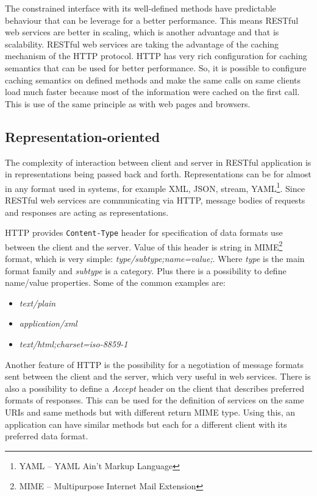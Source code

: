 \documentclass[12pt,final,oneside]{fithesis2}
\begin{document}
The constrained interface with its well-defined methods have predictable behaviour that can be leverage for a better performance. This means RESTful web services are better in scaling, which is another advantage and that is scalability. RESTful web services are taking the advantage of the caching mechanism of the HTTP protocol. HTTP has very rich configuration for caching semantics that can be used for better performance. So, it is possible to configure caching semantics on defined methods and make the same calls on same clients load much faster because most of the information were cached on the first call. This is use of the same principle as with web pages and browsers. 

\subsection*{Representation-oriented}
The complexity of interaction between client and server in RESTful application is in representations being passed back and forth. Representations can be for almost in any format used in systems, for example XML, JSON, stream, YAML\footnote{YAML -- YAML Ain't Markup Language}. Since RESTful web services are communicating via HTTP, message bodies of requests and responses are acting as representations.

HTTP provides \texttt{Content-Type} header for specification of data formats use between the client and the server. Value of this header is string in MIME\footnote{MIME -- Multipurpose Internet Mail Extension} format, which is very simple: \textit{type/subtype;name=value;}. Where \textit{type} is the main format family and \textit{subtype} is a category. Plus there is a possibility to define name/value properties. Some of the common examples are:

\begin{itemize}
\item
\textit{text/plain}

\item
\textit{application/xml}

\item
\textit{text/html;charset=iso-8859-1}
\end{itemize}

Another feature of HTTP is the possibility for a negotiation of message formats sent between the client and the server, which very useful in web services. There is also a possibility to define a \textit{Accept} header on the client that describes preferred formats of responses. This can be used for the definition of services on the same URIs and same methods but with different return MIME type. Using this, an application can have similar methods but each for a different client with its preferred data format.
\end{document}
